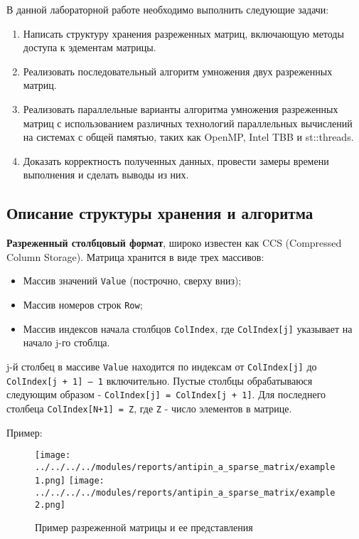 \documentclass{report}
\begin{document}
\par В данной лабораторной работе необходимо выполнить следующие задачи:

\begin{enumerate} 

\item Написать структуру хранения разреженных матриц, включающую методы доступа к эдементам матрицы.
\item Реализовать последовательный алгоритм умножения двух разреженных матриц.
\item Реализовать параллельные варианты алгоритма умножения разреженных матриц с использованием различных технологий параллельных вычислений на системах с общей памятью, таких как OpenMP, Intel TBB и st::threads.
\item Доказать корректность полученных данных, провести замеры времени выполнения и сделать выводы из них.

\end{enumerate} 

\newpage


\begin{center}\section*{Описание структуры хранения и алгоритма}\end{center}
\par \textbf{Разреженный столбцовый формат}, широко известен как CCS (Compressed Column Storage). Матрица хранится в виде трех массивов:
\begin{itemize} 
\item Массив значений \verb|Value| (построчно, сверху вниз);
\item Массив номеров строк \verb|Row|;
\item Массив индексов начала столбцов \verb|ColIndex|, где \verb|ColIndex[j]| указывает на начало j-го стоблца.
\end{itemize}
\par j-й столбец в массиве \verb|Value| находится по индексам от \verb|ColIndex[j]| до \\\verb|ColIndex[j + 1] – 1| включительно. Пустые столбцы обрабатываюся следующим образом - \verb|ColIndex[j] = ColIndex[j + 1]|.
Для последнего столбеца \verb|ColIndex[N+1] = Z|, где \verb|Z| - число элементов в матрице.
\par Пример:
\begin{figure}[htbp]
    \centering
    \texttt{[image: ../../../../modules/reports/antipin\_a\_sparse\_matrix/example1.png]}
    \texttt{[image: ../../../../modules/reports/antipin\_a\_sparse\_matrix/example2.png]}
    \caption{Пример разреженной матрицы и ее представления}\label{fig:../../../../modules/reports/antipin_a_sparse_matrix/example1.png}
\end{figure}
\end{document}
